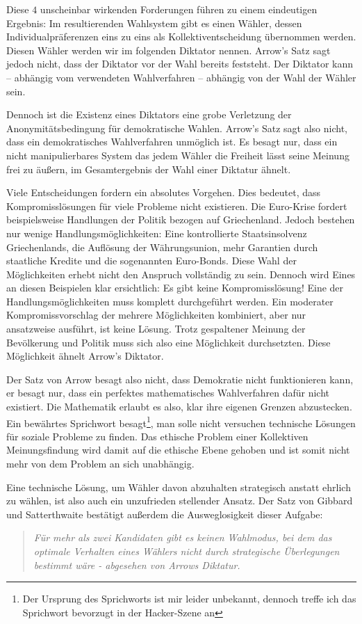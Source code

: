 \documentclass[BCOR5mm,DIV12,a4paper,10pt]{scrartcl}
\begin{document}
Diese $4$ unscheinbar wirkenden Forderungen führen zu einem eindeutigen Ergebnis: Im resultierenden Wahlsystem gibt es einen Wähler, dessen Individualpräferenzen eins zu eins als Kollektiventscheidung übernommen werden. Diesen Wähler werden wir im folgenden Diktator nennen. Arrow's Satz sagt jedoch nicht, dass der Diktator vor der Wahl bereits feststeht. Der Diktator kann -- abhängig vom verwendeten Wahlverfahren -- abhängig von der Wahl der Wähler sein.

Dennoch ist die Existenz eines Diktators eine grobe Verletzung der Anonymitätsbedingung für demokratische Wahlen. Arrow's Satz sagt also nicht, dass ein demokratisches Wahlverfahren unmöglich ist. Es besagt nur, dass ein nicht manipulierbares System das jedem Wähler die Freiheit lässt seine Meinung frei zu äußern, im Gesamtergebnis der Wahl einer Diktatur ähnelt.

Viele Entscheidungen fordern ein absolutes Vorgehen. Dies bedeutet, dass Kompromisslösungen für viele Probleme nicht existieren. Die Euro-Krise fordert beispielsweise Handlungen der Politik bezogen auf Griechenland. Jedoch bestehen nur wenige Handlungsmöglichkeiten: Eine kontrollierte Staatsinsolvenz Griechenlands, die Auflösung der Währungsunion, mehr Garantien durch staatliche Kredite und die sogenannten Euro-Bonds. Diese Wahl der Möglichkeiten erhebt nicht den Anspruch vollständig zu sein. Dennoch wird Eines an diesen Beispielen klar ersichtlich: Es gibt keine Kompromisslösung! Eine der Handlungsmöglichkeiten muss komplett durchgeführt werden. Ein moderater Kompromissvorschlag der mehrere Möglichkeiten kombiniert, aber nur ansatzweise ausführt, ist keine Lösung. Trotz gespaltener Meinung der Bevölkerung und Politik muss sich also eine Möglichkeit durchsetzten. Diese Möglichkeit ähnelt Arrow's Diktator.

Der Satz von Arrow besagt also nicht, dass Demokratie nicht funktionieren kann, er besagt nur, dass ein perfektes mathematisches Wahlverfahren dafür nicht existiert. Die Mathematik erlaubt es also, klar ihre eigenen Grenzen abzustecken. Ein bewährtes Sprichwort besagt\footnote{Der Ursprung des Sprichworts ist mir leider unbekannt, dennoch treffe ich das Sprichwort bevorzugt in der Hacker-Szene an}, man solle nicht versuchen technische Lösungen für soziale Probleme zu finden. Das ethische Problem einer Kollektiven Meinungsfindung wird damit auf die ethische Ebene gehoben und ist somit nicht mehr von dem Problem an sich unabhängig.

Eine technische Lösung, um Wähler davon abzuhalten strategisch anstatt ehrlich zu wählen, ist also auch ein unzufrieden stellender Ansatz. Der Satz von Gibbard und Satterthwaite bestätigt außerdem die Ausweglosigkeit dieser Aufgabe: 
\begin{quote}
\textit{Für mehr als zwei Kandidaten gibt es keinen Wahlmodus, bei dem das optimale Verhalten eines Wählers nicht durch strategische Überlegungen bestimmt wäre - abgesehen von Arrows Diktatur.}\cite{spektrum}
\end{quote}
\end{document}
